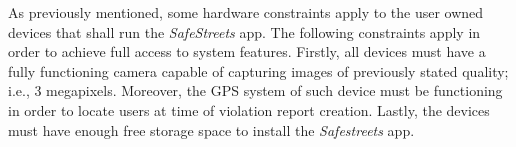 As previously mentioned, some hardware constraints apply to the user owned devices that shall run the \emph{SafeStreets} app. The following constraints apply in order to achieve full access to system features. Firstly, all devices must have a fully functioning camera capable of capturing images of previously stated quality; i.e., 3 megapixels. Moreover, the GPS system of such device must be functioning in order to locate users at time of violation report creation. Lastly, the devices must have enough free storage space to install the \emph{Safestreets} app.